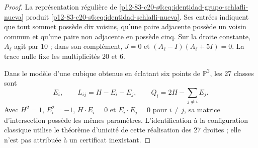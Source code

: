 \begin{proof}
La représentation régulière de
\cref{p12-83-c20-s6:eq:identidad-grupo-schlafli-nueva} produit
\cref{p12-83-c20-s6:eq:identidad-schlafli-nueva}. Ses entrées indiquent que tout sommet
possède dix voisins, qu’une paire adjacente possède un voisin commun et qu’une paire non
adjacente en possède cinq. Sur la droite constante, \(A_\ell\) agit par 10 ;
dans son complément, \(J=0\) et
\((A_\ell-I)(A_\ell+5I)=0\). La trace nulle fixe les multiplicités 20 et 6.

Dans le modèle d’une cubique obtenue en éclatant six points de
\(\mathbb P^2\), les 27 classes sont
\[
 E_i,\qquad L_{ij}=H-E_i-E_j,\qquad
 Q_i=2H-\sum_{j\ne i}E_j.
\]
Avec \(H^2=1\), \(E_i^2=-1\), \(H\cdot E_i=0\) et
\(E_i\cdot E_j=0\) pour \(i\ne j\), sa matrice d'intersection possède les
mêmes paramètres. L'identification à la configuration classique utilise le
théorème d'unicité de cette réalisation des 27 droites
\cite{Manivel2005} ; elle n'est pas attribuée à un certificat inexistant.
\end{proof}

